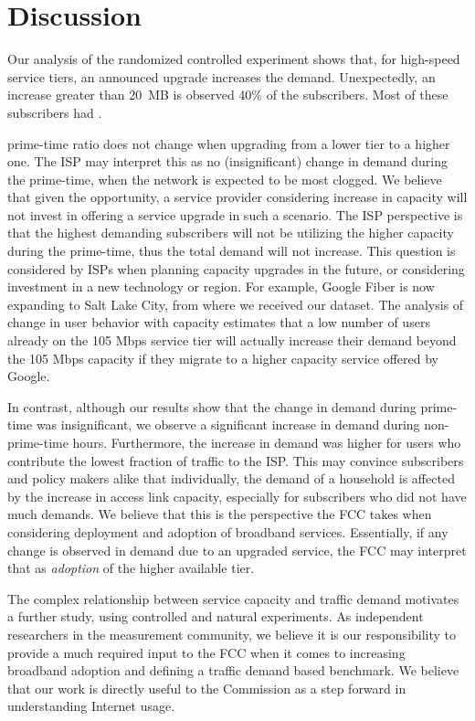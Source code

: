 \section{Discussion}\label{sec:discussion}

Our analysis of the randomized controlled experiment shows that, for high-speed
service tiers, an announced upgrade increases the demand. Unexpectedly, an increase
greater than 20~MB is observed 40\% of the subscribers. Most of these subscribers
had .


prime-time ratio does not change when upgrading from a lower tier to a higher 
one. The ISP may interpret this as no (insignificant) change in demand during 
the prime-time, when the network is expected to be most clogged. We
believe that given the opportunity, a service provider considering increase in 
capacity will not invest in offering a service upgrade in such a scenario. The 
ISP perspective is that the highest demanding subscribers will not be utilizing 
the higher capacity during the prime-time, thus the total demand will not 
increase. This question is considered by ISPs when planning capacity upgrades 
in the future, or considering investment in a new technology or region. For 
example, Google Fiber is now expanding to Salt Lake City, from where 
we received our dataset. The analysis of change in user behavior with capacity 
estimates that a low number of users already on the 105 Mbps service tier will 
actually increase their demand beyond the 105 Mbps capacity if they 
migrate to a higher capacity service offered by Google. 

In contrast, although our results show that the change in demand during 
prime-time was insignificant, we observe a significant increase in demand 
during non-prime-time hours. Furthermore, the increase in demand was higher for 
users who contribute the lowest fraction of traffic to the ISP. This may 
convince subscribers and policy makers alike that individually, the demand of a 
household is affected by the increase in access link capacity, especially for 
subscribers who did not have much demands. We believe that this is the 
perspective the FCC takes when considering deployment and adoption of 
broadband services. Essentially, if any change is observed in demand due to an 
upgraded service, the FCC may interpret that as \emph{adoption} of the higher 
available tier.

The complex relationship between service capacity and traffic demand motivates 
a further study, using controlled and natural experiments. As independent 
researchers in the measurement community, we believe it is our responsibility 
to 
provide a much required input to the FCC when it comes to increasing broadband 
adoption and defining a traffic demand based benchmark. We believe that our work 
is
directly useful to the Commission as a step forward in understanding Internet 
usage.